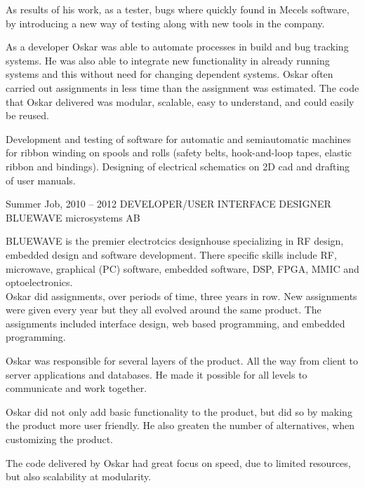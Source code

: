\documentclass[fontsize=10pt]{tccv}
\begin{document}
\begin{eventlist}
As results of his work, as a tester, bugs where quickly found in Mecels
software, by introducing a new way of testing along with new tools in the
company.

As a developer Oskar was able to automate processes in build and bug tracking
systems. He was also able to integrate new functionality in already running
systems and this without need for changing dependent systems. Oskar often
carried out assignments in less time than the assignment was estimated. The
code that Oskar delivered was modular, scalable, easy to understand, and could
easily be reused.


Development and testing of software for automatic and semiautomatic
machines for ribbon winding on spools and rolls (safety belts,
hook-and-loop tapes, elastic ribbon and bindings). Designing of
electrical schematics on 2D cad and drafting of user manuals.

\item{Summer Job, 2010 -- 2012}
     {DEVELOPER/USER INTERFACE DESIGNER}
     {BLUEWAVE microsystems AB}


     BLUEWAVE is the premier electrotcics designhouse specializing in RF
     design, embedded design and software development. There specific skills
     include RF, microwave, graphical (PC) software, embedded software, DSP,
     FPGA, MMIC and optoelectronics. \\

     Oskar did assignments, over periods of time, three years in row. New
     assignments were given every year but they all evolved around the same
     product. The assignments included interface design, web based programming,
     and embedded programming.

     Oskar was responsible for several layers of the product. All the way from
     client to server applications and databases. He made it possible for all
     levels to communicate and work together.

     Oskar did not only add basic functionality to the product, but did so by
     making the product more user friendly. He also greaten the number of
     alternatives, when customizing the product.

     The code delivered by Oskar had great focus on speed, due to limited
     resources, but also scalability at modularity.

\end{eventlist}
\end{document}
